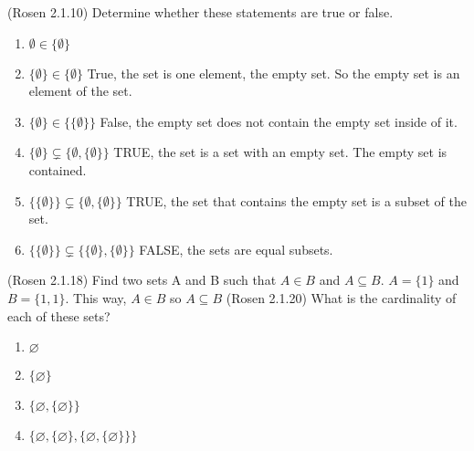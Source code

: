 \documentclass[10pt]{exam}
\begin{document}
\newpage
\begin{questions}

\question[3] (Rosen 2.1.10) Determine whether these statements are true or false.
\begin{enumerate} [label=(\alph*)]
  \item $\emptyset \in \{\emptyset\}$
  
  \item $\{\emptyset\} \in \{\emptyset\}$
  \newline True, the set is one element, the empty set. So the empty set is an element of the	set.
  \item $\{\emptyset\} \in \{\{\emptyset\}\}$
  \newline False, the empty set does not contain the empty set inside of it.
  \item $\{\emptyset\} \subsetneq \{\emptyset, \{\emptyset\}\}$
  \newline TRUE, the set is a set with an empty set. The empty set is contained.
  \item $\{\{\emptyset\}\} \subsetneq \{\emptyset, \{\emptyset\}\}$
  \newline TRUE, the set that contains the empty set is a subset of the set.
  \item $\{\{\emptyset\}\} \subsetneq \{\{\emptyset\}, \{\emptyset\}\}$
  \newline FALSE, the sets are equal subsets.
\end{enumerate}


\question[3] (Rosen 2.1.18) Find two sets A and B such that $A \in B$ and $A \subseteq B$.
 \newline $ A = \{1\}$ and $ B = \{1,{1}\}$. This way, $A \in B$ so $A \subseteq B$
\question[4] (Rosen 2.1.20) What is the cardinality of each of these sets?
\begin{enumerate} [label=(\alph*)]
 \item $\varnothing$
 \item $\{\varnothing\}$
 \item $\{\varnothing, \{\varnothing\}\}$
 \item $\{\varnothing, \{\varnothing\}, \{\varnothing, \{\varnothing\}\}\}$
 \end{enumerate}
 

\end{questions}
\end{document}

